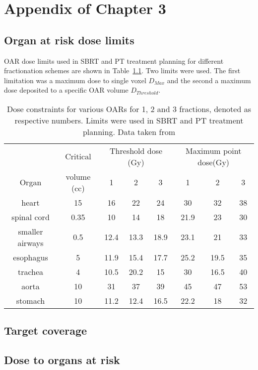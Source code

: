 \documentclass[type=dr, dr=rernat, accentcolor=tud7b,colorbacktitle, bigchapter, openright, twoside, 12pt ]{tudthesis}
\begin{document}
 
\chapter{Appendix of Chapter 3}

\section{Organ at risk dose limits}

OAR dose limits used in SBRT and PT treatment planning for different fractionation schemes are shown in Table~\ref{tab:oarlimits}. Two limits were used. The first limitation was a maximum dose to single voxel $D_{Max}$ and the second a maximum dose deposited to a 
specific OAR volume $D_{Threshold}$.

\begin{table}[H]
  \centering
  \caption{Dose constraints for various OARs for 1, 2 and 3 fractions, denoted as respective numbers. Limits were used in SBRT and PT treatment planning. Data taken from \cite{Benedict2010}}
  \begin{tabular}{c|c|c|c|c|c|c|c}
   & Critical  & \multicolumn{3}{c}{Threshold dose (Gy)} & \multicolumn{3}{|c}{Maximum point dose(Gy)}  \\
  Organ & volume (cc) & 1 & 2 & 3 & 1 & 2 & 3 \\
   \hline
   heart & 15 & 16 & 22 & 24 & 30 & 32 & 38\\
spinal cord & 0.35 & 10 & 14 & 18 & 21.9 & 23 & 30\\
smaller airways & 0.5 & 12.4 & 13.3 & 18.9 & 23.1 & 21 & 33\\
esophagus & 5 & 11.9 & 15.4 & 17.7 & 25.2 & 19.5 & 35\\
trachea & 4 & 10.5 & 20.2 & 15 & 30 & 16.5 & 40\\
aorta & 10 & 31 & 37 & 39 & 45 & 47 & 53\\
stomach & 10 & 11.2 & 12.4 & 16.5 & 22.2 & 18 & 32\\
\hline\hline
  
  \end{tabular}
  \label{tab:oarlimits}
\end{table}

\section{Target coverage}

\newpage
\section{Dose to organs at risk}
\end{document}
